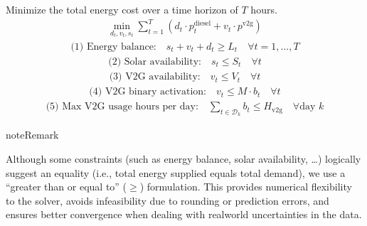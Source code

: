 \documentclass[letterpaper,10pt,english]{sphinxmanual}
\begin{document}
\sphinxAtStartPar
{} Minimize the total energy cost over a time horizon of \(T\) hours.
\begin{equation*}
\begin{split}\min_{d_t, v_t, s_t} \sum_{t=1}^{T} \left( d_t \cdot p_t^{\text{diesel}} + v_t \cdot p^{\text{v2g}} \right)\end{split}
\end{equation*}
\sphinxAtStartPar
{}
\begin{equation*}
\begin{split}\text{(1) Energy balance:} \quad s_t + v_t + d_t \geq L_t \quad \forall t = 1, \dots, T\end{split}
\end{equation*}\begin{equation*}
\begin{split}\text{(2) Solar availability:} \quad s_t \leq S_t \quad \forall t\end{split}
\end{equation*}\begin{equation*}
\begin{split}\text{(3) V2G availability:} \quad v_t \leq V_t \quad \forall t\end{split}
\end{equation*}\begin{equation*}
\begin{split}\text{(4) V2G binary activation:} \quad v_t \leq M \cdot b_t \quad \forall t\end{split}
\end{equation*}\begin{equation*}
\begin{split}\text{(5) Max V2G usage hours per day:} \quad \sum_{t \in \mathcal{D}_k} b_t \leq H_{\text{v2g}} \quad \forall \text{day } k\end{split}
\end{equation*}
\begin{sphinxadmonition}{note}{Remark}

\sphinxAtStartPar
Although some constraints (such as energy balance, solar availability, …) logically suggest an equality (i.e., total energy supplied equals total demand), we use a “greater than or equal to” (\(\geq\)) formulation.
This provides numerical flexibility to the solver, avoids infeasibility due to rounding or prediction errors, and ensures better convergence when dealing with real\sphinxhyphen{}world uncertainties in the data.
\end{sphinxadmonition}
\end{document}

